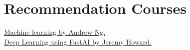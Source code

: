 \documentclass[a4paper,10pt]{article}
\begin{document}
\vspace{1cm}
\vspace{1cm}





\section{Recommendation Courses}

\href{https://www.coursera.org/learn/machine-learning}{Machine learning by Andrew Ng.}\\
\href{https://www.usfca.edu/data-institute/certificates/deep-learning-part-one}{Deep Learning using FastAI  by Jeremy Howard.}




\printbibliography
\end{document}
